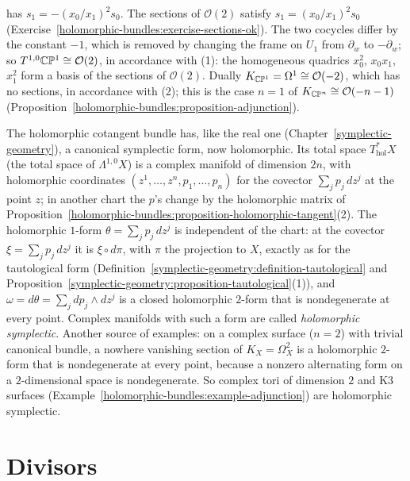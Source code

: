 \begin{example}
\begin{enumerate}
has $s_1 = -(x_0/x_1)^2s_0$. The sections of $\mathcal{O}(2)$ satisfy $s_1 = (x_0/x_1)^2s_0$ (Exercise~\ref{holomorphic-bundles:exercise-sections-ok}). The two cocycles differ by the constant $-1$, which is
removed by changing the frame on $U_1$ from $\partial_w$ to $-\partial_w$; so $T^{1,0}\mathbb{C}\mathbb{P}^1 \cong \mathcal{O}(2)$, in accordance with (1): the homogeneous quadrics $x_0^2$, $x_0x_1$, $x_1^2$ form a basis of
the sections of $\mathcal{O}(2)$. Dually $K_{\mathbb{C}\mathbb{P}^1} = \Omega^1 \cong \mathcal{O}(-2)$, which has no sections, in accordance with (2); this is the case $n = 1$ of $K_{\mathbb{C}\mathbb{P}^n} \cong \mathcal{O}(-n-1)$
(Proposition~\ref{holomorphic-bundles:proposition-adjunction}).
\end{enumerate}
\end{example}

\begin{remark}\label{holomorphic-bundles:remark-holomorphic-symplectic}
The holomorphic cotangent bundle has, like the real one (Chapter~\ref{symplectic-geometry}), a canonical symplectic form, now holomorphic. Its total space $T^*_{\mathrm{hol}}X$ (the total space of $\Lambda^{1,0}X$) is a complex
manifold of dimension $2n$, with holomorphic coordinates $(z^1, \ldots, z^n, p_1, \ldots, p_n)$ for the covector $\sum_jp_j\,dz^j$ at the point $z$; in another chart the $p$'s change by the holomorphic matrix of
Proposition~\ref{holomorphic-bundles:proposition-holomorphic-tangent}(2). The holomorphic $1$-form $\theta = \sum_jp_j\,dz^j$ is independent of the chart: at the covector $\xi = \sum_jp_j\,dz^j$ it is $\xi \circ d\pi$, with $\pi$ the
projection to $X$, exactly as for the tautological form (Definition~\ref{symplectic-geometry:definition-tautological} and Proposition~\ref{symplectic-geometry:proposition-tautological}(1)), and $\omega = d\theta = \sum_jdp_j \wedge dz^j$ is a closed holomorphic $2$-form that is nondegenerate at every point. Complex manifolds with such a form are
called \emph{holomorphic symplectic}. Another source of examples: on a complex surface ($n = 2$) with trivial canonical bundle, a nowhere vanishing section of $K_X = \Omega^2_X$ is a holomorphic $2$-form that is
nondegenerate at every point, because a nonzero alternating form on a $2$-dimensional space is nondegenerate. So complex tori of dimension $2$ and K3 surfaces (Example~\ref{holomorphic-bundles:example-adjunction}) are
holomorphic symplectic.
\end{remark}

\section{Divisors}\label{holomorphic-bundles:section-divisors}

